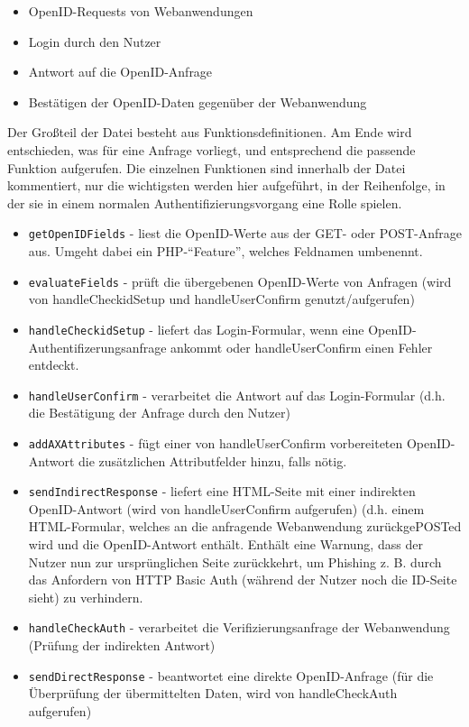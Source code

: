 \documentclass[parskip=half]{scrartcl}
\begin{document}
\begin{itemize}
	\item OpenID-Requests von Webanwendungen
	\item Login durch den Nutzer
	\item Antwort auf die OpenID-Anfrage
	\item Bestätigen der OpenID-Daten gegenüber der Webanwendung
\end{itemize}

Der Großteil der Datei besteht aus Funktionsdefinitionen.
Am Ende wird entschieden, was für eine Anfrage vorliegt, und entsprechend die passende Funktion aufgerufen.
Die einzelnen Funktionen sind innerhalb der Datei kommentiert, nur die wichtigsten werden hier aufgeführt,
in der Reihenfolge, in der sie in einem normalen Authentifizierungsvorgang eine Rolle spielen.

\begin{itemize}
	\item \texttt{getOpenIDFields} - liest die OpenID-Werte aus der GET- oder POST-Anfrage aus. Umgeht dabei ein PHP-"`Feature"', welches Feldnamen umbenennt.
	\item \texttt{evaluateFields} - prüft die übergebenen OpenID-Werte von Anfragen (wird von handleCheckidSetup und handleUserConfirm genutzt/aufgerufen)
	\item \texttt{handleCheckidSetup} - liefert das Login-Formular, wenn eine OpenID-Authentifizerungsanfrage ankommt oder handleUserConfirm einen Fehler entdeckt.
	\item \texttt{handleUserConfirm} - verarbeitet die Antwort auf das Login-Formular (d.h. die Bestätigung der Anfrage durch den Nutzer)
	\item \texttt{addAXAttributes} - fügt einer von handleUserConfirm vorbereiteten OpenID-Antwort die zusätzlichen Attributfelder hinzu, falls nötig.
	\item \texttt{sendIndirectResponse} - liefert eine HTML-Seite mit einer indirekten OpenID-Antwort (wird von handleUserConfirm aufgerufen)
											(d.h. einem HTML-Formular, welches an die anfragende Webanwendung zurückgePOSTed wird und die OpenID-Antwort enthält.
											Enthält eine Warnung, dass der Nutzer nun zur ursprünglichen Seite zurückkehrt,
											um Phishing z. B. durch das Anfordern von HTTP Basic Auth (während der Nutzer noch die ID-Seite sieht) zu verhindern.
	\item \texttt{handleCheckAuth} - verarbeitet die Verifizierungsanfrage der Webanwendung (Prüfung der indirekten Antwort)
	\item \texttt{sendDirectResponse} - beantwortet eine direkte OpenID-Anfrage (für die Überprüfung der übermittelten Daten, wird von handleCheckAuth aufgerufen)
\end{itemize}
\end{document}
